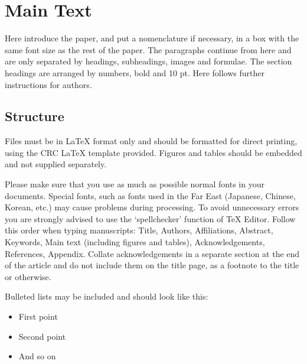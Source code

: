 \documentclass[5p,times,procedia]{elsarticle}
\begin{document}


\section{Main Text}
\label{main}

Here introduce the paper, and put a nomenclature if necessary, in a box with the same font size as the rest of the paper. The paragraphs continue from here and are only separated by headings, subheadings, images and formulae. The section headings are arranged by numbers, bold and 10 pt. Here follows further instructions for authors.

\vspace*{8pt}
\begin{nomenclature}
\begin{deflist}[A]
\end{deflist}
\end{nomenclature}\vskip24pt

\subsection{ Structure}
Files must be in LaTeX format only and should be formatted for direct printing, using the CRC LaTeX template provided. Figures and tables should be embedded and not supplied separately. 

Please make sure that you use as much as possible normal fonts in your documents. Special fonts, such as fonts used in\vadjust{\vfill\pagebreak} the Far East (Japanese, Chinese, Korean, etc.) may cause problems during processing. To avoid unnecessary errors you are strongly advised to use the `spellchecker' function of TeX Editor. Follow this order when typing manuscripts: Title, Authors, Affiliations, Abstract, Keywords, Main text (including figures and tables), Acknowledgements, References, Appendix. Collate acknowledgements in a separate section at the end of the article and do not include them on the title page, as a footnote to the title or otherwise.

Bulleted lists may be included and should look like this:
\begin{itemize}[]
\item First point
\item Second point
\item And so on
\end{itemize}
\end{document}
